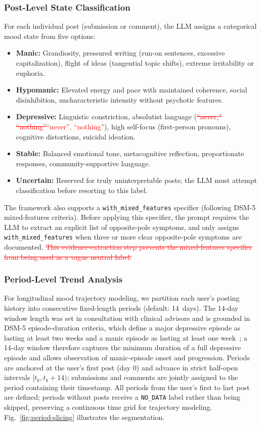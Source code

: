 \documentclass[runningheads]{llncs}
\newcommand{\rev}[1]{\textcolor{red}{#1}}
\newcommand{\del}[1]{\textcolor{red}{\sout{#1}}}
\newcommand{\rev}[1]{#1}
\newcommand{\del}[1]{}
\begin{document}
\subsubsection{Post-Level State Classification}
For each individual post (submission or comment), the LLM assigns a categorical mood state from five options:

\begin{itemize}
\item \textbf{Manic:} Grandiosity, pressured writing (run-on sentences, excessive capitalization), flight of ideas (tangential topic shifts), extreme irritability or euphoria.
\item \textbf{Hypomanic:} Elevated energy and pace with maintained coherence, social disinhibition, uncharacteristic intensity without psychotic features.
\item \textbf{Depressive:} Linguistic constriction, absolutist language (\del{``never,'' ``nothing''}\rev{``never'', ``nothing''}), high self-focus (first-person pronouns), cognitive distortions, suicidal ideation.
\item \textbf{Stable:} Balanced emotional tone, metacognitive reflection, proportionate responses, community-supportive language.
\item \textbf{Uncertain:} Reserved for truly uninterpretable posts; the LLM must attempt classification before resorting to this label.
\end{itemize}

The framework also supports a \texttt{with\_mixed\_features} specifier (following DSM-5 mixed-features criteria). Before applying this specifier, the prompt requires the LLM to extract an explicit list of opposite-pole symptoms, and only assigns \texttt{with\_mixed\_features} when three or more clear opposite-pole symptoms are documented. \del{This evidence-extraction step prevents the mixed-features specifier from being used as a vague neutral label.}

\subsubsection{Period-Level Trend Analysis}
For longitudinal mood trajectory modeling, we partition each user's posting history into consecutive fixed-length periods (default: 14~days). The 14-day window length was set in consultation with clinical advisors and is grounded in DSM-5 episode-duration criteria, which define a major depressive episode as lasting at least two weeks and a manic episode as lasting at least one week~\cite{apa2013dsm5}; a 14-day window therefore captures the minimum duration of a full depressive episode and allows observation of manic-episode onset and progression. Periods are anchored at the user's first post (day 0) and advance in strict half-open intervals $[t_k, t_k + 14)$; submissions and comments are jointly assigned to the period containing their timestamp. All periods from the user's first to last post are defined; periods without posts receive a \texttt{NO\_DATA} label rather than being skipped, preserving a continuous time grid for trajectory modeling. Fig.~\ref{fig:period-slicing} illustrates the segmentation.
\end{document}

